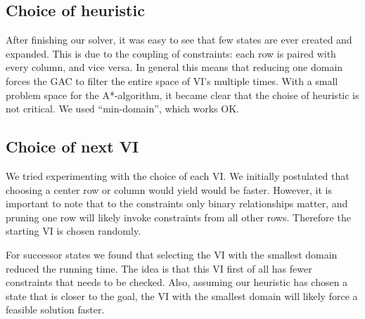 \documentclass[journal]{IEEEtran}
\begin{document}
\subsection{Choice of heuristic}
After finishing our solver, it was easy to see that few states are ever created and
expanded. This is due to the coupling of constraints: each row is paired
with every column, and vice versa. In general this means that reducing one domain forces
the GAC to filter the entire space of VI's multiple times.
With a small problem space for the A*-algorithm, it became clear that the
choise of heuristic is not critical. We used ``min-domain'', which works OK.

\subsection{Choice of next VI}
We tried experimenting with the choice of each VI. We initially postulated that
choosing a center row or column would yield would be faster. However, it is
important to note that to the constraints only binary relationships matter,
and pruning one row will likely invoke constraints from all other rows.
Therefore the starting VI is chosen randomly.

For successor states we found that selecting the VI with the smallest domain
reduced the running time. The idea is that this VI first of all has fewer
constraints that needs to be checked. Also, assuming our heuristic has chosen
a state that is closer to the goal, the VI with the smallest domain will likely
force a feasible solution faster.
\end{document}
